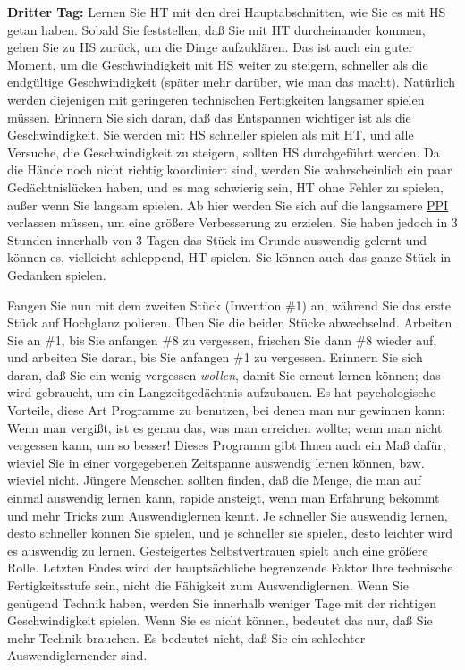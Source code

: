 \textbf{Dritter Tag:} Lernen Sie HT mit den drei Hauptabschnitten, wie Sie es mit HS getan haben.
Sobald Sie feststellen, daß Sie mit HT durcheinander kommen, gehen Sie zu HS zurück, um die Dinge aufzuklären.
Das ist auch ein guter Moment, um die Geschwindigkeit mit HS weiter zu steigern, schneller als die endgültige Geschwindigkeit (später mehr darüber, wie man das macht).
Natürlich werden diejenigen mit geringeren technischen Fertigkeiten langsamer spielen müssen.
Erinnern Sie sich daran, daß das Entspannen wichtiger ist als die Geschwindigkeit.
Sie werden mit HS schneller spielen als mit HT, und alle Versuche, die Geschwindigkeit zu steigern, sollten HS durchgeführt werden.
Da die Hände noch nicht richtig koordiniert sind, werden Sie wahrscheinlich ein paar Gedächtnislücken haben, und es mag schwierig sein, HT ohne Fehler zu spielen, außer wenn Sie langsam spielen.
Ab hier werden Sie sich auf die langsamere \hyperlink{c1ii15}{PPI} verlassen müssen, um eine größere Verbesserung zu erzielen.
Sie haben jedoch in 3 Stunden innerhalb von 3 Tagen das Stück im Grunde auswendig gelernt und können es, vielleicht schleppend, HT spielen.
Sie können auch das ganze Stück in Gedanken spielen.

Fangen Sie nun mit dem zweiten Stück (Invention \#1) an, während Sie das erste Stück auf Hochglanz polieren.
Üben Sie die beiden Stücke abwechselnd.
Arbeiten Sie an \#1, bis Sie anfangen \#8 zu vergessen, frischen Sie dann \#8 wieder auf, und arbeiten Sie daran, bis Sie anfangen \#1 zu vergessen.
Erinnern Sie sich daran, daß Sie ein wenig vergessen \textit{wollen}, damit Sie erneut lernen können; das wird gebraucht, um ein Langzeitgedächtnis aufzubauen.
Es hat psychologische Vorteile, diese Art Programme zu benutzen, bei denen man nur gewinnen kann: Wenn man vergißt, ist es genau das, was man erreichen wollte; wenn man nicht vergessen kann, um so besser!
Dieses Programm gibt Ihnen auch ein Maß dafür, wieviel Sie in einer vorgegebenen Zeitspanne auswendig lernen können, bzw. wieviel nicht.
Jüngere Menschen sollten finden, daß die Menge, die man auf einmal auswendig lernen kann, rapide ansteigt, wenn man Erfahrung bekommt und mehr Tricks zum Auswendiglernen kennt.
Je schneller Sie auswendig lernen, desto schneller können Sie spielen, und je schneller sie spielen, desto leichter wird es auswendig zu lernen.
Gesteigertes Selbstvertrauen spielt auch eine größere Rolle.
Letzten Endes wird der hauptsächliche begrenzende Faktor Ihre technische Fertigkeitsstufe sein, nicht die Fähigkeit zum Auswendiglernen.
Wenn Sie genügend Technik haben, werden Sie innerhalb weniger Tage mit der richtigen Geschwindigkeit spielen.
Wenn Sie es nicht können, bedeutet das nur, daß Sie mehr Technik brauchen.
Es bedeutet nicht, daß Sie ein schlechter Auswendiglernender sind.

